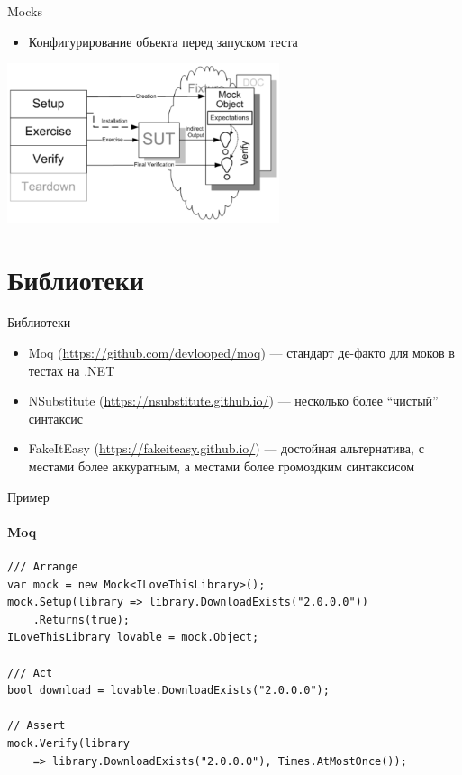 \documentclass{../../slides-style}
\begin{document}
    \begin{frame}{Mocks}
        \begin{itemize}
            \item Конфигурирование объекта перед запуском теста
        \end{itemize}
        \begin{center}
            \includegraphics[width=0.6\textwidth]{mock.png}
        \end{center}
    \end{frame}

    \section{Библиотеки}

    \begin{frame}{Библиотеки}
        \begin{itemize}
            \item Moq (\url{https://github.com/devlooped/moq}) --- стандарт де-факто для моков в тестах на .NET
            \item NSubstitute (\url{https://nsubstitute.github.io/}) --- несколько более \enquote{чистый} синтаксис
            \item FakeItEasy (\url{https://fakeiteasy.github.io/}) --- достойная альтернатива, с местами более аккуратным, а местами более громоздким синтаксисом
        \end{itemize}
    \end{frame}

    \begin{frame}[fragile]{Пример}
        \framesubtitle{Moq}
        \begin{verbatim}
/// Arrange
var mock = new Mock<ILoveThisLibrary>();
mock.Setup(library => library.DownloadExists("2.0.0.0"))
    .Returns(true);
ILoveThisLibrary lovable = mock.Object;

/// Act
bool download = lovable.DownloadExists("2.0.0.0");

// Assert
mock.Verify(library 
    => library.DownloadExists("2.0.0.0"), Times.AtMostOnce());
        \end{verbatim}
    \end{frame}
\end{document}
